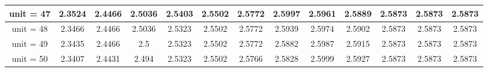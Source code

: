 \begin{table*}[ht]
\begin{tabular}{|c|c|c|c|c|c|c|c|c|c|c|c|c|}
\hline
unit = 47 &
2.3524 & 2.4466 & 2.5036 & 2.5403 & 2.5502 & 2.5772 & 2.5997 & 2.5961 & 2.5889 & 2.5873 & 2.5873 & 2.5873 \\
\hline
unit = 48 &
2.3466 & 2.4466 & 2.5036 & 2.5323 & 2.5502 & 2.5772 & 2.5939 & 2.5974 & 2.5902 & 2.5873 & 2.5873 & 2.5873 \\
\hline
unit = 49 &
2.3435 & 2.4466 & 2.5 & 2.5323 & 2.5502 & 2.5772 & 2.5882 & 2.5987 & 2.5915 & 2.5873 & 2.5873 & 2.5873 \\
\hline
unit = 50 &
2.3407 & 2.4431 & 2.494 & 2.5323 & 2.5502 & 2.5766 & 2.5828 & 2.5999 & 2.5927 & 2.5873 & 2.5873 & 2.5873 \\
\hline
\end{tabular}
\normalsize
\end{table*}
